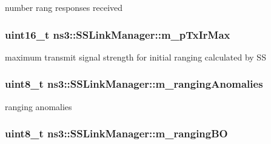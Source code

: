number rang responses received 

\subsubsection[{\texorpdfstring{m\+\_\+p\+Tx\+Ir\+Max}{m_pTxIrMax}}]{\setlength{\rightskip}{0pt plus 5cm}uint16\+\_\+t ns3\+::\+S\+S\+Link\+Manager\+::m\+\_\+p\+Tx\+Ir\+Max\hspace{0.3cm}{\ttfamily [private]}}\hypertarget{classns3_1_1SSLinkManager_a2ab2dc4d93d45e1d43163c02c5d38869}{}\label{classns3_1_1SSLinkManager_a2ab2dc4d93d45e1d43163c02c5d38869}


maximum transmit signal strength for initial ranging calculated by SS 

\subsubsection[{\texorpdfstring{m\+\_\+ranging\+Anomalies}{m_rangingAnomalies}}]{\setlength{\rightskip}{0pt plus 5cm}uint8\+\_\+t ns3\+::\+S\+S\+Link\+Manager\+::m\+\_\+ranging\+Anomalies\hspace{0.3cm}{\ttfamily [private]}}\hypertarget{classns3_1_1SSLinkManager_af2f529561d4191695c6b4dc049dbda04}{}\label{classns3_1_1SSLinkManager_af2f529561d4191695c6b4dc049dbda04}


ranging anomalies 

\subsubsection[{\texorpdfstring{m\+\_\+ranging\+BO}{m_rangingBO}}]{\setlength{\rightskip}{0pt plus 5cm}uint8\+\_\+t ns3\+::\+S\+S\+Link\+Manager\+::m\+\_\+ranging\+BO\hspace{0.3cm}{\ttfamily [private]}}\hypertarget{classns3_1_1SSLinkManager_a15d8026ec20372ce2855c237591af9f5}{}\label{classns3_1_1SSLinkManager_a15d8026ec20372ce2855c237591af9f5}


